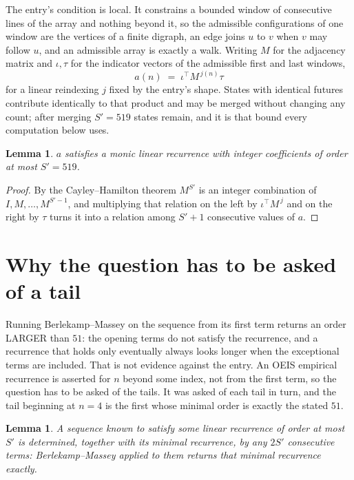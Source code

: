 \documentclass[11pt,a4paper]{article}
\theoremstyle{plain}
\newtheorem{lemma}[theorem]{Lemma}
\theoremstyle{definition}
\begin{document}
The entry's condition is local. It constrains a bounded window of consecutive lines of the
array and nothing beyond it, so the admissible configurations of one window are the vertices of
a finite digraph, an edge joins $u$ to $v$ when $v$ may follow $u$, and an admissible array is
exactly a walk. Writing $M$ for the adjacency matrix and $\iota,\tau$ for the indicator vectors
of the admissible first and last windows,
\[
a(n)\;=\;\iota^{\!\top}M^{\,j(n)}\tau
\]
for a linear reindexing $j$ fixed by the entry's shape. States with identical futures
contribute identically to that product and may be merged without changing any count; after
merging $S'=519$ states remain, and it is that bound every computation below uses.

\begin{lemma}\label{lem:cf}
$a$ satisfies a monic linear recurrence with integer coefficients of order at most $S'=519$.
\end{lemma}

\begin{proof}
By the Cayley--Hamilton theorem $M^{S'}$ is an integer combination of $I,M,\dots,M^{S'-1}$,
and multiplying that relation on the left by $\iota^{\!\top}M^{\,j}$ and on the right by
$\tau$ turns it into a relation among $S'+1$ consecutive values of $a$.
\end{proof}

\section{Why the question has to be asked of a tail}

Running Berlekamp--Massey on the sequence from its first term returns an order LARGER than $51$: the opening terms do not satisfy the recurrence, and a recurrence that holds only eventually always looks longer when the exceptional terms are included. That is not evidence against the entry. An OEIS empirical recurrence is asserted for $n$ beyond some index, not from the first term, so the question has to be asked of the tails. It was asked of each tail in turn, and the tail beginning at $n=4$ is the first whose minimal order is exactly the stated $51$.

\begin{lemma}\label{lem:bm}
A sequence known to satisfy some linear recurrence of order at most $S'$ is determined,
together with its minimal recurrence, by any $2S'$ consecutive terms: Berlekamp--Massey applied
to them returns that minimal recurrence exactly.
\end{lemma}
\end{document}
